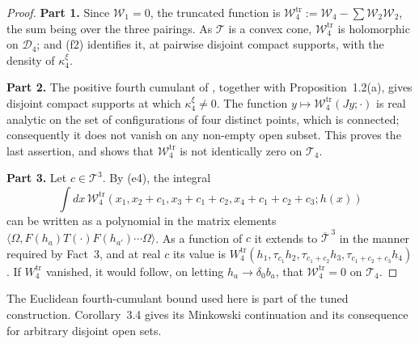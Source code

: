 \documentclass[11pt,letterpaper,reqno]{amsart}
\theoremstyle{definition}
\begin{document}
\begin{proof}
\textbf{Part 1.}
Since $\mathcal W_1=0$, the truncated function is $\mathcal W_4^{\mathrm{tr}}:=\allowbreak \mathcal W_4-\sum\mathcal W_2\mathcal W_2$, the sum being over the three pairings.
As $\mathcal T$ is a convex cone, $\mathcal W_4^{\mathrm{tr}}$ is holomorphic on $\mathcal D_4$; and (f2) identifies it, at pairwise disjoint compact supports, with the density of $\kappa_4^\xi$.

\textbf{Part 2.}
The positive fourth cumulant of \cite[Theorem~44(D6)]{QEDIII}, together with Proposition~1.2(a), gives disjoint compact supports at which $\kappa_4^\xi\ne0$.
The function $y\mapsto\mathcal W_4^{\mathrm{tr}}(Jy;\cdot)$ is real analytic on the set of configurations of four distinct points, which is connected; consequently it does not vanish on any non-empty open subset.
This proves the last assertion, and shows that $\mathcal W_4^{\mathrm{tr}}$ is not identically zero on $\mathcal T_4$.

\textbf{Part 3.}
Let $c\in\mathcal T^3$.
By (e4), the integral
\begin{equation*}
\int dx\,\mathcal W_4^{\mathrm{tr}}(x_1,x_2+c_1,x_3+c_1+c_2,x_4+c_1+c_2+c_3;h(x))
\end{equation*}
can be written as a polynomial in the matrix elements $\langle\Omega,F(h_a)T(\cdot)F(h_{a'})\cdots\Omega\rangle$.
As a function of $c$ it extends to $\overline{\mathcal T}^{\,3}$ in the manner required by Fact~3, and at real $c$ its value is $W_4^{\mathrm{tr}}(h_1,\allowbreak \tau_{c_1}h_2,\allowbreak \tau_{c_1+c_2}h_3,\allowbreak \tau_{c_1+c_2+c_3}h_4)$.
If $W_4^{\mathrm{tr}}$ vanished, it would follow, on letting $h_a\to\delta_0b_a$, that $\mathcal W_4^{\mathrm{tr}}=0$ on $\mathcal T_4$.
\end{proof}

The Euclidean fourth-cumulant bound used here is part of the tuned
construction. Corollary~3.4 gives its Minkowski continuation and its
consequence for arbitrary disjoint open sets.
\end{document}

